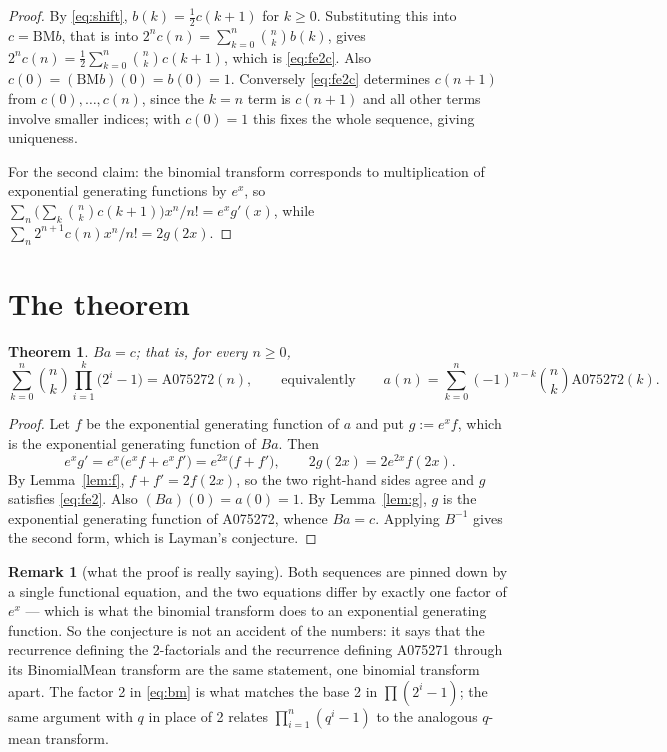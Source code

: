 \documentclass[11pt,a4paper]{article}
\theoremstyle{plain}
\newtheorem{theorem}{Theorem}
\theoremstyle{definition}
\newtheorem*{remark}{Remark}
\begin{document}
\begin{proof}
By \eqref{eq:shift}, $b(k)=\tfrac12c(k+1)$ for $k\ge0$. Substituting this into
$c=\mathrm{BM}b$, that is into $2^{n}c(n)=\sum_{k=0}^{n}\binom{n}{k}b(k)$, gives
$2^{n}c(n)=\tfrac12\sum_{k=0}^{n}\binom{n}{k}c(k+1)$, which is \eqref{eq:fe2c}. Also
$c(0)=(\mathrm{BM}b)(0)=b(0)=1$. Conversely \eqref{eq:fe2c} determines $c(n+1)$ from
$c(0),\dots,c(n)$, since the $k=n$ term is $c(n+1)$ and all other terms involve smaller
indices; with $c(0)=1$ this fixes the whole sequence, giving uniqueness.

For the second claim: the binomial transform corresponds to multiplication of exponential
generating functions by $e^{x}$, so
$\sum_{n}\bigl(\sum_{k}\binom{n}{k}c(k+1)\bigr)x^{n}/n!=e^{x}g'(x)$, while
$\sum_{n}2^{n+1}c(n)x^{n}/n!=2g(2x)$.
\end{proof}

\section{The theorem}

\begin{theorem}\label{thm:main}
$Ba=c$; that is, for every $n\ge0$,
\[
  \sum_{k=0}^{n}\binom{n}{k}\prod_{i=1}^{k}\bigl(2^{i}-1\bigr)=\mathrm{A075272}(n),
  \qquad\text{equivalently}\qquad
  a(n)=\sum_{k=0}^{n}(-1)^{n-k}\binom{n}{k}\mathrm{A075272}(k).
\]
\end{theorem}

\begin{proof}
Let $f$ be the exponential generating function of $a$ and put $g:=e^{x}f$, which is the
exponential generating function of $Ba$. Then
\[
  e^{x}g'=e^{x}\bigl(e^{x}f+e^{x}f'\bigr)=e^{2x}\bigl(f+f'\bigr),
  \qquad 2g(2x)=2e^{2x}f(2x).
\]
By Lemma~\ref{lem:f}, $f+f'=2f(2x)$, so the two right-hand sides agree and $g$ satisfies
\eqref{eq:fe2}. Also $(Ba)(0)=a(0)=1$. By Lemma~\ref{lem:g}, $g$ is the exponential
generating function of A075272, whence $Ba=c$. Applying $B^{-1}$ gives the second form,
which is Layman's conjecture.
\end{proof}

\begin{remark}[what the proof is really saying]
Both sequences are pinned down by a single functional equation, and the two equations
differ by exactly one factor of $e^{x}$ --- which is what the binomial transform does to an
exponential generating function. So the conjecture is not an accident of the numbers: it
says that the recurrence defining the 2-factorials and the recurrence defining A075271
through its BinomialMean transform are the same statement, one binomial transform apart.
The factor 2 in \eqref{eq:bm} is what matches the base 2 in $\prod(2^{i}-1)$; the same
argument with $q$ in place of 2 relates $\prod_{i=1}^{n}(q^{i}-1)$ to the analogous $q$-mean
transform.
\end{remark}
\end{document}
